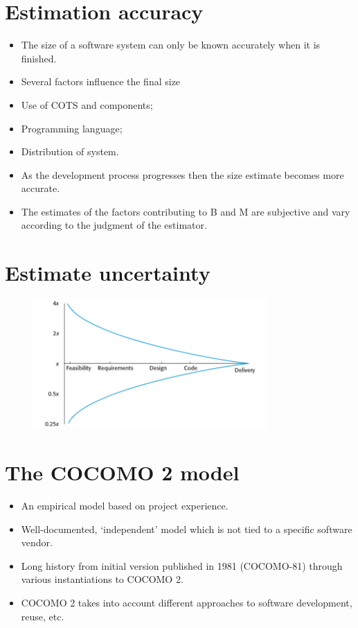 \section{Estimation accuracy}
\begin{itemize}

\item The size of a software system can only be known accurately when it is finished.

\item Several factors influence the final size   \item Use of COTS and components;   \item Programming language;
  \item Distribution of system.

\item As the development process progresses then the size estimate becomes more accurate.

\item The estimates of the factors contributing to B and M are subjective and vary according to the judgment of the estimator.
\end{itemize}

\section{Estimate uncertainty}
\begin{figure}[h!]
    \centering
    \includegraphics[width = 0.8\textwidth]{./figures/L6_6.png}
    \caption{}
    \label{fig:L6_6}
\end{figure}

\section{The COCOMO 2 model}
\begin{itemize}

\item An empirical model based on project experience.

\item Well-documented, ‘independent’ model which is not tied to a specific software vendor.

\item Long history from initial version published in 1981 (COCOMO-81) through various instantiations to COCOMO 2.

\item COCOMO 2 takes into account different approaches to software development, reuse, etc.
\end{itemize}
